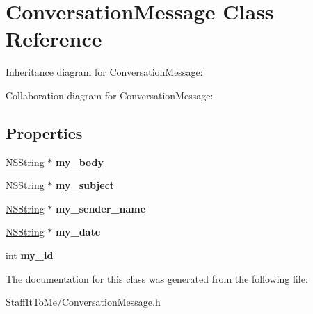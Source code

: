 \hypertarget{interface_conversation_message}{
\section{\-Conversation\-Message \-Class \-Reference}
\label{interface_conversation_message}
}


\-Inheritance diagram for \-Conversation\-Message\-:


\-Collaboration diagram for \-Conversation\-Message\-:
\subsection*{\-Properties}
\begin{DoxyCompactItemize}
\item 
\hypertarget{interface_conversation_message_adbf8ca19dc49d2e291d18ebaa99522aa}{
\hyperlink{class_n_s_string}{\-N\-S\-String} $\ast$ {\bfseries my\-\_\-body}}
\label{interface_conversation_message_adbf8ca19dc49d2e291d18ebaa99522aa}

\item 
\hypertarget{interface_conversation_message_a86970e596986a21161c200ea8a282ad3}{
\hyperlink{class_n_s_string}{\-N\-S\-String} $\ast$ {\bfseries my\-\_\-subject}}
\label{interface_conversation_message_a86970e596986a21161c200ea8a282ad3}

\item 
\hypertarget{interface_conversation_message_ac082095255c0428b9089fbfa3db6af52}{
\hyperlink{class_n_s_string}{\-N\-S\-String} $\ast$ {\bfseries my\-\_\-sender\-\_\-name}}
\label{interface_conversation_message_ac082095255c0428b9089fbfa3db6af52}

\item 
\hypertarget{interface_conversation_message_add0965f0c609c5c5d1421a46264ae853}{
\hyperlink{class_n_s_string}{\-N\-S\-String} $\ast$ {\bfseries my\-\_\-date}}
\label{interface_conversation_message_add0965f0c609c5c5d1421a46264ae853}

\item 
\hypertarget{interface_conversation_message_a25df8f022a63122d426e06177ca1948a}{
int {\bfseries my\-\_\-id}}
\label{interface_conversation_message_a25df8f022a63122d426e06177ca1948a}

\end{DoxyCompactItemize}


\-The documentation for this class was generated from the following file\-:\begin{DoxyCompactItemize}
\item 
\-Staff\-It\-To\-Me/\-Conversation\-Message.\-h\end{DoxyCompactItemize}
